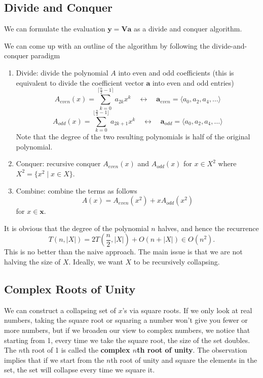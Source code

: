 \subsection{Divide and Conquer}

We can formulate the evaluation $\mathbf{y}=\mathbf{V}\mathbf{a}$ as a divide and conquer algorithm.

We can come up with an outline of the algorithm by following the divide-and-conquer paradigm
\begin{enumerate}
    \item Divide: divide the polynomial $A$ into even and odd coefficients (this is equivalent to divide the coefficient vector $\mathbf{a}$ into even and odd entries)
    $$
    A_{even}(x) = \sum_{k=0}^{\lceil \frac{n}{2}-1 \rceil} a_{2k}x^k \quad \leftrightarrow \quad \mathbf{a}_{even} = \langle a_0,a_2,a_4,\ldots \rangle
    $$
    $$
    A_{odd}(x) = \sum_{k=0}^{\lfloor \frac{n}{2}-1 \rfloor} a_{2k+1}x^k \quad \leftrightarrow \quad \mathbf{a}_{odd} = \langle a_0,a_2,a_4,\ldots \rangle
    $$
    Note that the degree of the two resulting polynomials is half of the original polynomial.

    \item Conquer: recursive conquer $A_{even}(x)$ and $A_{odd}(x)$ for $x \in X^2$ where $X^2 = \{x^2 \mid x \in X\}$.
    
    \item Combine: combine the terms as follows
    $$
    A(x) = A_{even}(x^2) + xA_{odd}(x^2)
    $$
    for $x \in \mathbf{x}$.
\end{enumerate}

It is obvious that the degree of the polynomial $n$ halves, and hence the recurrence
$$
T(n,|X|) = 2T\left( \frac{n}{2},|X| \right) + O(n + |X|) \in O(n^2).
$$
This is no better than the naive approach. The main issue is that we are not halving the size of $X$. Ideally, we want $X$ to be recursively collapsing.

\subsection{Complex Roots of Unity} 

We can construct a collapsing set of $x$'s via square roots. If we only look at real numbers, taking the square root or squaring a number won't give you fewer or more numbers, but if we broaden our view to complex numbers, we notice that starting from 1, every time we take the square root, the size of the set doubles. The $n$th root of 1 is called the \textbf{complex $n$th root of unity}. The observation implies that if we start from the $n$th root of unity and square the elements in the set, the set will collapse every time we square it.

